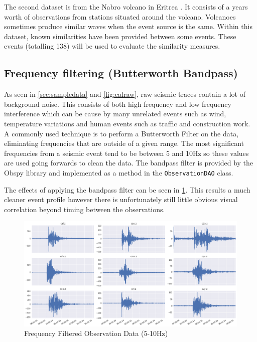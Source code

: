 \documentclass[../report.tex]{subfiles}
\begin{document}
	The second dataset is from the Nabro volcano in Eritrea \citep{eritrea1}.  It consists of a years worth of observations from stations situated around the volcano.  Volcanoes sometimes produce similar waves when the event source is the same.  Within this dataset, known similarities have been provided between some events.  These events (totalling 138) will be used to evaluate the similarity measures.

\subsection{Frequency filtering (Butterworth Bandpass)}
	As seen in \cref{sec:sampledata} and \cref{fig:calraw}, raw seismic traces contain a lot of background noise.  This consists of both high frequency and low frequency interference which can be cause by many unrelated events such as wind, temperature variations and human events such as traffic and construction work.  A commonly used technique \citep{man-seis-obs} is to perform a Butterworth Filter \citep{bandpass} on the data, eliminating frequencies that are outside of a given range.  The most significant frequencies from a seismic event tend to be between 5 and 10Hz so these values are used going forwards to clean the data.  The bandpass filter is provided by the Obspy library and implemented as a method in the \verb|ObservationDAO| class.
	
	The effects of applying the bandpass filter can be seen in \cref{fig:calbandpass}.  This results a much cleaner event profile however there is unfortunately still little obvious visual correlation beyond timing between the observations.

\begin{figure}[H]
	\centering
	\includegraphics[width=1\linewidth]{img/cal_bandpass}
	\caption{Frequency Filtered Observation Data (5-10Hz)}
	\label{fig:calbandpass}
\end{figure}
\end{document}
